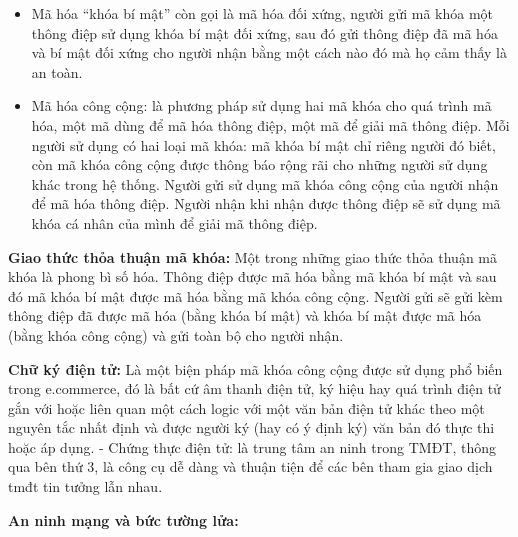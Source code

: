 \documentclass[12pt]{article}
\begin{document}
\begin{itemize}
    \item Mã hóa “khóa bí mật” còn gọi là mã hóa đối xứng, người gửi mã khóa một thông điệp sử dụng khóa bí mật đối xứng, sau đó gửi thông điệp đã mã hóa và bí mật đối xứng cho người nhận bằng một cách nào đó mà họ cảm thấy là an toàn. 
    \item Mã hóa công cộng: là phương pháp sử dụng hai mã khóa cho quá trình mã hóa, một mã dùng để mã hóa thông điệp, một mã để giải mã thông điệp. Mỗi người sử dụng có hai loại mã khóa: mã khóa bí mật chỉ riêng người đó biết, còn mã khóa công cộng được thông báo rộng rãi cho những người sử dụng khác trong hệ thống. Người gửi sử dụng mã khóa công cộng của người nhận để mã hóa thông điệp. Người nhận khi nhận được thông điệp sẽ sử dụng mã khóa cá nhân của mình để giải mã thông điệp.
\end{itemize}

\textbf{Giao thức thỏa thuận mã khóa:} Một trong những giao thức thỏa thuận mã khóa là phong bì số hóa. Thông điệp được mã hóa bằng mã khóa bí mật và sau đó mã khóa bí mật được mã hóa bằng mã khóa công cộng. Người gửi sẽ gửi kèm thông điệp đã được mã hóa (bằng khóa bí mật) và khóa bí mật được mã hóa (bằng khóa công cộng) và gửi toàn bộ cho người nhận.

\textbf{Chữ ký điện tử: }Là một biện pháp mã khóa công cộng được sử dụng phổ biến trong e.commerce, đó là bất cứ âm thanh điện tử, ký hiệu hay quá trình điện tử gắn với hoặc liên quan một cách logic với một văn bản điện tử khác theo một nguyên tắc nhất định và được người ký (hay có ý định ký) văn bản đó thực thi hoặc áp dụng. - Chứng thực điện tử: là trung tâm an ninh trong TMĐT, thông qua bên thứ 3, là công cụ dễ dàng và thuận tiện để các bên tham gia giao dịch tmđt tin tưởng lẫn nhau.

\textbf{An ninh mạng và bức tường lửa:}
\end{document}
